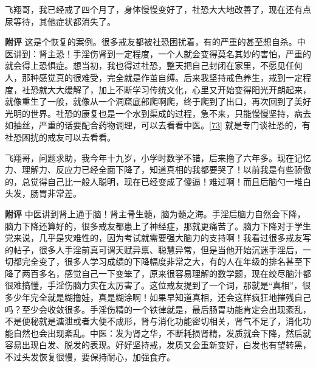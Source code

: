 \begin{case}
    飞翔哥，我已经戒了四个月了，身体慢慢变好了，社恐大大地改善了，现在还有点尿等待，其他症状都消失了。

    \textbf{附评} 这是个恢复的案例。很多戒友都被社恐困扰着，有的严重的甚至想自杀。中医讲到：肾主恐！手淫伤肾到一定程度，一个人就会变得莫名其妙的害怕，严重的就会得上恐惧症。想当初，我也得过社恐，整天把自己封闭在家里，不愿见任何人，那种感觉真的很难受，完全就是作茧自缚。后来我坚持戒色养生，戒到一定程度，社恐就大大缓解了，加上不断学习传统文化，心里又开始变得阳光开朗起来，就像重生了一般，就像从一个洞窟底部爬啊爬，终于爬到了出口，再次回到了美好光明的世界。社恐的康复也是一个水到渠成的过程，急不来，只能慢慢坚持，病去如抽丝，严重的话要配合药物调理，可以去看看中医。\ref{73} 就是专门谈社恐的，有社恐困扰的戒友可以去看看。
\end{case}

\begin{case}
    飞翔哥，问题求助，我今年十九岁，小学时数学不错，后来撸了六年多。现在记忆力、理解力、反应力已经全面下降了，知道真相的我都要哭了！以前我是有些骄傲的，总觉得自己比一般人聪明，现在已经变成了傻逼！难过啊！而且后脑勺一堆白头发，肠胃非常差。

    \textbf{附评} 中医讲到肾上通于脑！肾主骨生髓，脑为髓之海。手淫后脑力自然会下降，脑力下降还算好的，很多戒友都患上了神经症，那就更痛苦了。脑力下降对于学生党来说，几乎是灾难性的，因为考试就需要强大脑力的支持啊！我看过很多戒友写的帖子，很多人手淫前真可谓天赋异禀、聪慧异常，但是当他开始沉迷手淫后，一切都完全变了，很多人学习成绩的下降幅度非常之大，有的人在年级的排名甚至下降了两百多名，感觉自己一下变笨了，原来很容易理解的数学题，现在绞尽脑汁都很难搞懂，手淫伤脑力实在太厉害了。这位戒友提到了一个词，那就是“真相”，很多少年完全就是糊撸娃，真是糊涂啊！如果早知道真相，还会这样疯狂地摧残自己吗？至少会收敛很多。手淫伤精的一个铁律就是，最后肠胃功能肯定会出现紊乱，不是便秘就是溏泄或者大便不成形，肾与消化功能密切相关，肾气不足了，消化功能自然也会出现紊乱。中医：发为肾之华，不断耗损肾精，发质就会下降，然后就容易出现白发、脱发的表现。好好坚持戒，发质又会重新变好，白发也有望转黑，不过头发恢复很慢，要保持耐心，加强食疗。
\end{case}

